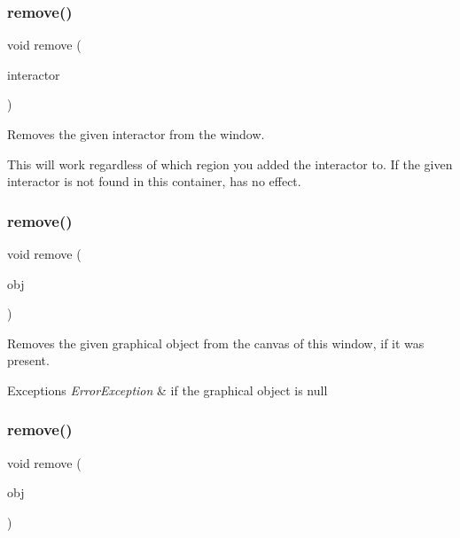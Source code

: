 \subsubsection{\texorpdfstring{remove()}{remove()}\hspace{0.1cm}{\footnotesize\ttfamily [2/4]}}
{\footnotesize\ttfamily void remove (\begin{DoxyParamCaption}\item[{\mbox{\hyperlink{classGInteractor}{G\+Interactor}} \&}]{interactor }\end{DoxyParamCaption})\hspace{0.3cm}{\ttfamily [virtual]}}



Removes the given interactor from the window. 

This will work regardless of which region you added the interactor to. If the given interactor is not found in this container, has no effect. \mbox{\label{classGWindow_afc8bff4a24e05c696cbe4cba7403e558}} 
\subsubsection{\texorpdfstring{remove()}{remove()}\hspace{0.1cm}{\footnotesize\ttfamily [3/4]}}
{\footnotesize\ttfamily void remove (\begin{DoxyParamCaption}\item[{\mbox{\hyperlink{classGObject}{G\+Object}} $\ast$}]{obj }\end{DoxyParamCaption})\hspace{0.3cm}{\ttfamily [virtual]}}



Removes the given graphical object from the canvas of this window, if it was present. 


\begin{DoxyExceptions}{Exceptions}
{\em Error\+Exception} & if the graphical object is null \\
\hline
\end{DoxyExceptions}
\mbox{\label{classGWindow_a37cf4a26853ac22c5e3a21335dfc7ac9}} 
\subsubsection{\texorpdfstring{remove()}{remove()}\hspace{0.1cm}{\footnotesize\ttfamily [4/4]}}
{\footnotesize\ttfamily void remove (\begin{DoxyParamCaption}\item[{\mbox{\hyperlink{classGObject}{G\+Object}} \&}]{obj }\end{DoxyParamCaption})\hspace{0.3cm}{\ttfamily [virtual]}}



